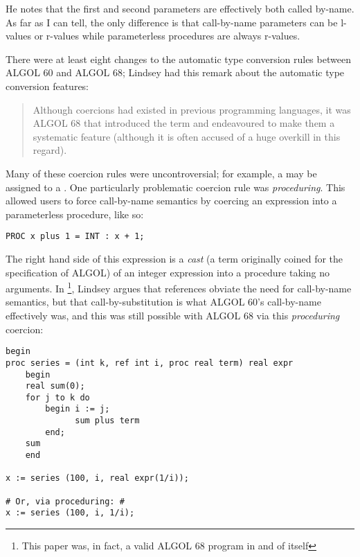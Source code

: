 

He notes that the first and second parameters are effectively both called by-name.
As far as I can tell, the only difference is that call-by-name parameters can
be l-values or r-values while parameterless procedures are always r-values.

There were at least eight changes to the automatic type conversion rules
between ALGOL 60 and ALGOL 68;
Lindsey had this remark about the automatic type conversion features:
\begin{quotation}
Although coercions had existed in previous programming languages, it was ALGOL 
68 that introduced the term and endeavoured to make them a systematic feature 
(although it is often accused of a huge overkill in this regard).
\end{quotation}

Many of these coercion rules were uncontroversial; for example, a 
may be assigned to a .
One particularly problematic coercion rule was \textit{proceduring}.
This allowed users to force call-by-name semantics by coercing an expression
into a parameterless procedure, like so:

\begin{lstlisting}[language=algol,frame=single]
      PROC x plus 1 = INT : x + 1;
\end{lstlisting}

The right hand side of this expression is a \textit{cast}
(a term originally coined for the specification of ALGOL)
of an integer expression into a procedure taking no arguments.
In \footnote{This paper was, in fact,
a valid ALGOL 68 program in and of itself}, Lindsey argues that references
obviate the need for call-by-name semantics, but that call-by-substitution is what
ALGOL 60's call-by-name effectively was, and this was still possible with ALGOL 68
via this \textit{proceduring} coercion:

\begin{lstlisting}[language=algol,frame=single]
begin
proc series = (int k, ref int i, proc real term) real expr
    begin
    real sum(0);
    for j to k do
        begin i := j;
              sum plus term
        end;
    sum
    end

x := series (100, i, real expr(1/i)); 

# Or, via proceduring: #
x := series (100, i, 1/i); 
\end{lstlisting}

